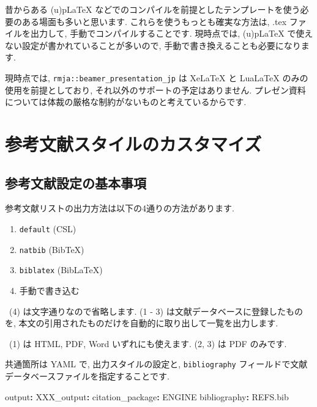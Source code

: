 \documentclass[
]{ltjsarticle}
\newenvironment{Shaded}{\begin{snugshade}}{\end{snugshade}}
\newcommand{\AttributeTok}[1]{\textcolor[rgb]{0.77,0.63,0.00}{#1}}
\newcommand{\FunctionTok}[1]{\textcolor[rgb]{0.00,0.00,0.00}{#1}}
\newcommand{\KeywordTok}[1]{\textcolor[rgb]{0.13,0.29,0.53}{\textbf{#1}}}
\providecommand{\tightlist}{%
  \setlength{\itemsep}{0pt}\setlength{\parskip}{0pt}}
\begin{document}
昔からある (u)pLaTeX などでのコンパイルを前提としたテンプレートを使う必要のある場面も多いと思います. これらを使うもっとも確実な方法は, .tex ファイルを出力して, 手動でコンパイルすることです. 現時点では, (u)pLaTeX で使えない設定が書かれていることが多いので, 手動で書き換えることも必要になります.

現時点では, \texttt{rmja::beamer\_presentation\_jp} は XeLaTeX と LuaLaTeX のみの使用を前提としており, それ以外のサポートの予定はありません. プレゼン資料については体裁の厳格な制約がないものと考えているからです.

\hypertarget{biblio}{%
\section{参考文献スタイルのカスタマイズ}\label{biblio}}

\hypertarget{ux53c2ux8003ux6587ux732eux8a2dux5b9aux306eux57faux672cux4e8bux9805}{%
\subsection{参考文献設定の基本事項}\label{ux53c2ux8003ux6587ux732eux8a2dux5b9aux306eux57faux672cux4e8bux9805}}

参考文献リストの出力方法は以下の4通りの方法があります.

\begin{enumerate}
\def\labelenumi{\arabic{enumi}.}
\tightlist
\item
  \texttt{default} (CSL)
\item
  \texttt{natbib} (BibTeX)
\item
  \texttt{biblatex} (BibLaTeX)
\item
  手動で書き込む
\end{enumerate}

~(4) は文字通りなので省略します. (1 - 3) は文献データベースに登録したものを, 本文の引用されたものだけを自動的に取り出して一覧を出力します.

~(1) は HTML, PDF, Word いずれにも使えます. (2, 3) は PDF のみです.

共通箇所は YAML で, 出力スタイルの設定と, \texttt{bibliography} フィールドで文献データベースファイルを指定することです.

\begin{Shaded}
\begin{Highlighting}[]
\FunctionTok{output}\KeywordTok{:}
\AttributeTok{    }\FunctionTok{XXX\_output}\KeywordTok{:}
\AttributeTok{      }\FunctionTok{citation\_package}\KeywordTok{:}\AttributeTok{ ENGINE}
\FunctionTok{bibliography}\KeywordTok{:}\AttributeTok{ REFS.bib}
\end{Highlighting}
\end{Shaded}
\end{document}
